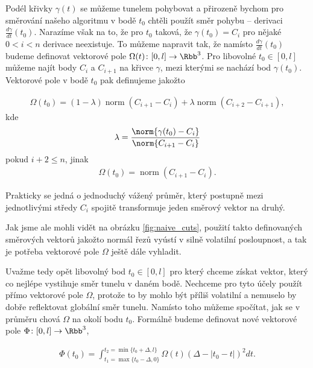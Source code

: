 Podél křivky $ \gamma(t) $ se můžeme tunelem pohybovat a přirozeně bychom pro
směrování našeho algoritmu v bodě $ t_0 $ chtěli použít směr pohybu – derivaci
$ \frac{d\gamma}{dt}(t_0) $. Narazíme však na to, že pro $ t_0 $ taková, že
$ \gamma(t_0) = C_i $ pro nějaké $ 0 < i < n $ derivace neexistuje. To můžeme
napravit tak, že namísto $ \frac{d\gamma}{dt}(t_0) $ budeme definovat vektorové
pole $ \Omega(t) \colon [0, l] \to \Rbb^3 $. Pro libovolné $ t_0 \in [0, l] $
můžeme najít body $ C_i $ a $ C_{i + 1} $ na křivce $ \gamma $, mezi kterými
se nachází bod $ \gamma(t_0) $. Vektorové pole v bodě $ t_0 $ pak definujeme
jakožto

\begin{align}
    \Omega(t_0) =
            (1 - \lambda) \operatorname{norm}(C_{i + 1} - C_i)
            +
            \lambda \operatorname{norm}(C_{i + 2} - C_{i + 1})
        ,
\end{align}
kde
\begin{align}
    \lambda = \frac{\norm{\gamma(t_0) - C_i}}{\norm{C_{i + 1} - C_i}}
\end{align}
pokud $ i + 2 \leq n $, jinak
\begin{align}
    \Omega(t_0) = \operatorname{norm}(C_{i + 1} - C_i).
\end{align}

Prakticky se jedná o jednoduchý vážený průměr, který postupně mezi jednotlivými středy
$ C_i $ spojitě transformuje jeden směrový vektor na druhý.

Jak jsme ale mohli vidět na obrázku \ref{fig:naive_cuts}, použití takto definovaných
směrových vektorů jakožto normál řezů vyústí v silně volatilní posloupnost,
a tak je potřeba vektorové pole $ \Omega $ ještě dále vyhladit.

Uvažme tedy opět libovolný bod $ t_0 \in [0, l] $ pro který chceme získat vektor,
který co nejlépe vystihuje směr tunelu v daném bodě. Nechceme pro tyto účely použít
přímo vektorové pole $ \Omega $, protože to by mohlo být příliš volatilní
a nemuselo by dobře reflektovat globální směr tunelu. Namísto toho můžeme spočítat,
jak se v průměru chová $ \Omega $ na okolí bodu $ t_0 $. Formálně budeme
definovat nové vektorové pole $ \Phi \colon [0, l] \to \Rbb^3 $,

\begin{align}
    \Phi(t_0) = \int_{t_1 = \max\{t_0 - \Delta, 0\}}^{t_2 = \min\{t_0 + \Delta, l\}}
        \Omega(t) (\Delta - \left| t_0 - t \right| )^2 dt.
\end{align}

